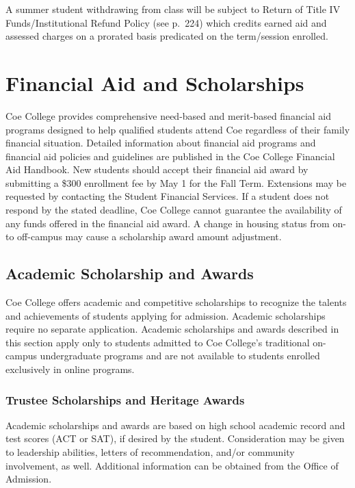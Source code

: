 \documentclass[
  letterpaper,
]{scrbook}
\begin{document}
A summer student withdrawing from class will be subject to Return of
Title IV Funds/Institutional Refund Policy (see p.~224) which credits
earned aid and assessed charges on a prorated basis predicated on the
term/session enrolled.

\chapter{Financial Aid and
Scholarships}\label{financial-aid-and-scholarships}

Coe College provides comprehensive need-based and merit-based financial
aid programs designed to help qualified students attend Coe regardless
of their family financial situation. Detailed information about
financial aid programs and financial aid policies and guidelines are
published in the Coe College Financial Aid Handbook. New students should
accept their financial aid award by submitting a \$300 enrollment fee by
May 1 for the Fall Term. Extensions may be requested by contacting the
Student Financial Services. If a student does not respond by the stated
deadline, Coe College cannot guarantee the availability of any funds
offered in the financial aid award. A change in housing status from on-
to off-campus may cause a scholarship award amount adjustment.

\section{Academic Scholarship and
Awards}\label{academic-scholarship-and-awards}

Coe College offers academic and competitive scholarships to recognize
the talents and achievements of students applying for admission.
Academic scholarships require no separate application. Academic
scholarships and awards described in this section apply only to students
admitted to Coe College's traditional on-campus undergraduate programs
and are not available to students enrolled exclusively in online
programs.

\subsection{\texorpdfstring{\textbf{Trustee Scholarships and Heritage
Awards}}{Trustee Scholarships and Heritage Awards}}\label{trustee-scholarships-and-heritage-awards}

Academic scholarships and awards are based on high school academic
record and test scores (ACT or SAT), if desired by the student.
Consideration may be given to leadership abilities, letters of
recommendation, and/or community involvement, as well. Additional
information can be obtained from the Office of Admission.
\end{document}
